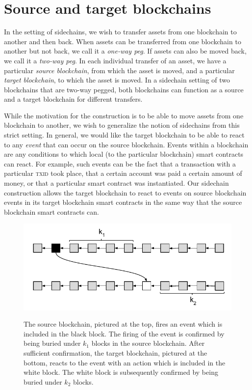 \section{Source and target blockchains}

In the setting of sidechains, we wish to transfer assets from one blockchain to
another and then back. When assets can be transferred from one blockchain to
another but not back, we call it a \emph{one-way peg}. If assets can also be
moved back, we call it a \emph{two-way peg}. In each individual transfer of an
asset, we have a particular \emph{source blockchain}, from which the asset is
moved, and a particular \emph{target blockchain}, to which the asset is moved.
In a sidechain setting of two blockchains that are two-way pegged, both
blockchains can function as a source and a target blockchain for different
transfers.

While the motivation for the construction is to be able to move assets from one
blockchain to another, we wish to generalize the notion of sidechains from this
strict setting. In general, we would like the target blockchain to be able to
react to any \emph{event} that can occur on the source blockchain. Events within
a blockchain are any conditions to which local (to the particular blockchain)
smart contracts can react. For example, such events can be the fact that a
transaction with a particular \textsc{txid} took place, that a certain account
was paid a certain amount of money, or that a particular smart contract was
instantiated. Our sidechain construction allows the target blockchain to react
to events on source blockchain events in its target blockchain smart contracts
in the same way that the source blockchain smart contracts can.

\begin{figure}
    \caption{The source blockchain, pictured at the top, fires an event which is
             included in the black block. The firing of the event is confirmed
             by being buried under $k_1$ blocks in the source blockchain. After
             sufficient confirmation, the target blockchain, pictured at the
             bottom, reacts to the event with an action which is included in the
             white block. The white block is subsequently confirmed by being
             buried under $k_2$ blocks.}
    \centering
    \includegraphics[width=0.9 \columnwidth,keepaspectratio]{figures/events.pdf}
    \label{fig.events}
\end{figure}
